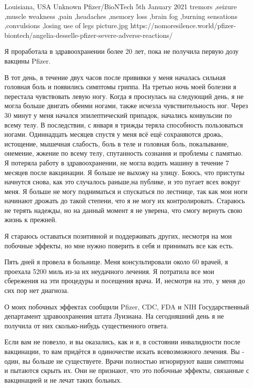           {Louisiana, USA}
          {Unknown}
          {Pfizer/BioNTech}
          {5th January 2021}
          {
            tremors
            ,seizure
            ,muscle weakness
            ,pain
            ,headaches
            ,memory loss
            ,brain fog
            ,burning sensations
            ,convulsions
            ,losing use of legs
          }
          {picture.jpg}
          {https://nomoresilence.world/pfizer-biontech/angelia-desselle-pfizer-severe-adverse-reactions/}
          {            
Я проработала в здравоохранении более 20 лет, пока не получила первую дозу
вакцины Pfizer.

В тот день, в течение двух часов после прививки у меня началась сильная головная
боль и появились симптомы гриппа. На третью ночь моей болезни я перестала
чувствовать левую ногу. Когда я проснулась на следующий день, я не могла больше
двигать обеими ногами, также исчезла чувствительность ног. Через 30 минут у меня
начался эпилептический припадок, начались конвульсии по всему телу. В
последствии, с января я трижды теряла способность пользоваться
ногами. Одиннадцать месяцев спустя у меня всё ещё сохраняются дрожь, истощение,
мышечная слабость, боль в теле и головная боль, покалывание, онемение, жжение по
всему телу, спутанность сознания и проблемы с памятью. Я потеряла работу в
здравоохранении, не могла водить машину в течение 7 месяцев после вакцинации. Я
больше не выхожу на улицу. Боюсь, что приступы начнутся снова, как это случалось
раньше,на публике, и это пугает всех вокруг меня. Я больше не могу подниматься и
спускаться по лестнице, так как мои ноги начинают дрожать до такой степени, что
я не могу их контролировать. Стараюсь не терять надежды, но на данный момент я
не уверена, что смогу вернуть свою жизнь к прежней.

Я стараюсь оставаться позитивной и поддерживать других, несмотря на мои побочные
эффекты, но мне нужно поверить в себя и принимать все как есть.

Пять дней я провела в больнице.  Меня консультировали около 60 врачей, я
проехала 5200 миль из-за их неудачного лечения. Я потратила все мои сбережения
на эти процедуры и посещения врача.  И, несмотря на это, у меня до сих пор нет
диагноза.

О моих побочных эффектах сообщили Pfizer, CDC, FDA и NIH Государственный
департамент здравоохранения штата Луизиана. На сегодняшний день я не получила от
них сколько-нибудь существенного ответа.

Если вам не повезло, и вы оказались, как и я, в состоянии инвалидности после
вакцинации, то вам придётся в одиночестве искать всевозможного лечения. Вы -
один, вы больше не существуете. Врачи полностью игнорируют ваши симптомы и
пытаются скрыть их. Они не признают, что это побочные эффекты, связанные с
вакцинацией и не лечат таких больных.
}
